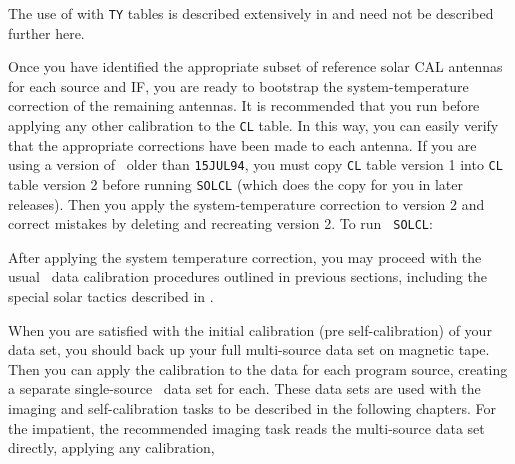      The use of {\tt {}} with {\tt TY} tables is described
extensively in  and need not be described further here.


     Once you have identified the appropriate subset of reference
solar CAL antennas for each source and IF, you are ready to bootstrap
the system-temperature correction of the remaining antennas.  It is
recommended that you run {\tt {}} before applying any other
calibration to the {\tt CL} table.  In this way, you can easily verify
that the appropriate corrections have been made to each antenna.  If
you are using a version of \AIPS\ older than {\tt 15JUL94}, you must
copy {\tt CL} table version 1 into {\tt CL} table version 2 before
running {\tt SOLCL} (which does the copy for you in later releases).
Then you apply the system-temperature correction to version 2 and
correct mistakes by deleting and recreating version 2.  To run {\tt
SOLCL}:

     After applying the system temperature correction, you may proceed
with the usual \AIPS\ data calibration procedures outlined in previous
sections, including the special solar tactics described in
.


     When you are satisfied with the initial calibration (pre
self-calibration) of your data set, you should back up your full
multi-source data set on magnetic tape.  Then you can apply the
calibration to the data for each program source, creating a separate
single-source \uv\ data set for each.  These data sets are used with
the imaging and self-calibration tasks to be described in the
following chapters.  For the impatient, the recommended imaging task
reads the multi-source data set directly, applying any calibration,

